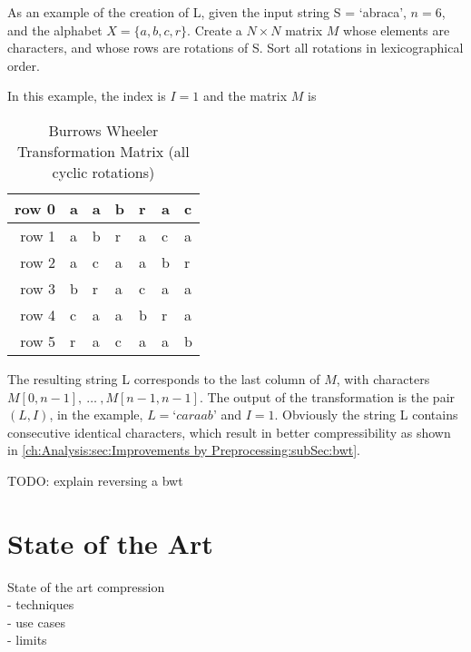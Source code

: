 \par {
As an example of the creation of L, given the input string S = ‘abraca’, $n = 6$, and the alphabet
$X = \{a,b,c,r\}$. Create a $N \times N$ matrix $M$ whose elements are characters, and
whose rows are rotations of S. Sort all rotations in lexicographical order.
}

\par{
In this example, the index is $I = 1$ and the matrix $M$ is

\begin{table}[h]
	\centering
	\begin{tabular}{r|l|l|l|l|l|l}
		row 0 & a & a & b & r & a & c\\
		\hline
		row 1 & a & b & r & a & c & a\\
		\hline
		row 2 & a & c & a & a & b & r\\
		\hline
		row 3 & b & r & a & c & a & a\\
		\hline
		row 4 & c & a & a & b & r & a\\
		\hline
		row 5 & r & a & c & a & a & b
		\label{tab:t10 bwt-example}
	\end{tabular}
	\caption{Burrows Wheeler Transformation Matrix (all cyclic rotations)}
\end{table}


The resulting string L corresponds to the last column of $M$, with characters $M[0,n -1],\: \dots \: ,M[n - 1, n - 1]$. The output of the transformation is the pair $(L, I)$, in the example, $L = ‘caraab’$ and $I = 1$. Obviously the string L contains consecutive identical characters, which result in better compressibility as shown in \ref{ch:Analysis:sec:Improvements by Preprocessing:subSec:bwt}.
}

\par{
TODO: explain reversing a bwt
}

\section{State of the Art}
\label{ch:Principles of compression:sec:SOTA}
State of the art compression\\
- techniques\\
- use cases\\
- limits\\

